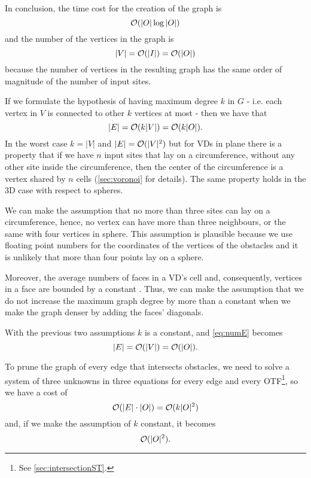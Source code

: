 \documentclass[dissertation.tex]{subfiles}
\begin{document}
In conclusion, the time cost for the creation of the graph
is
\newcommand{\eqCostGraph}{\ensuremath{\bigO(|\obsSet|\log |\obsSet|)}}
\begin{equation}
  \label{eq:costGraph}
  \eqCostGraph
\end{equation}
and the number of the vertices in the graph
is 
\begin{equation}
  \label{eq:numV}
  |V|=\mathcal{O}(|I|)=\mathcal{O}(|O|)
\end{equation}
because the number of vertices in the resulting graph has the
same order of magnitude of the number of input sites.

If we formulate the hypothesis of having maximum degree $k$ in $G$ -
i.e. each vertex in $V$ is connected to other $k$ vertices at most -
then we have that
\begin{equation}
  \label{eq:numE}
  |E|=\mathcal{O}(k|V|)=\mathcal{O}(k|O|).
\end{equation}
In the worst case $k=|V|$ and $|E|=\mathcal{O}(|V|^2)$ but for \acp{VD} in
plane there is a property that if we have $n$ input sites
that lay on a circumference, without any other site inside the
circumference, then the center of the circumference is a vertex shared
by $n$ cells (\cref{sec:voronoi} for details). The same property holds
in the 3D case with respect to spheres.

We can make the assumption
that no more than three sites can lay 
on a circumference, hence, no vertex can have more than three neighbours,
or the same with four vertices in sphere. This assumption is
plausible because we use floating point numbers for the coordinates of
the vertices of the obstacles and it is unlikely that more than
four points lay on a sphere.

Moreover, the average numbers of faces in a \ac{VD}'s cell and,
consequently, vertices
in a face are
bounded by a constant \cite{okabe}. Thus, we can make the assumption
that we do not increase
the maximum 
graph degree by more than a constant when we make the graph
denser by adding the faces' diagonals.

With the previous two assumptions $k$ is a constant,
and \cref{eq:numE} becomes
\begin{equation*}
  |E|=\mathcal{O}(|V|)=\mathcal{O}(|O|).
\end{equation*}

To prune the graph of every edge that intersects obstacles, we need
to solve a system of three unknowns in three equations for every edge
and every \ac{OTF}\footnote{See \cref{sec:intersectionST}.}, so
we have a cost of
\newcommand{\eqCostPruning}{\ensuremath{\bigO(k|\obsSet|^2)}}
\begin{equation}
  \label{eq:costPruning}
  \bigO(|E|\cdot|\obsSet|)=\eqCostPruning
\end{equation}
and, if we make the assumption of $k$ constant, it becomes
\begin{equation*}
  \mathcal{O}(|O|^2).
\end{equation*}
\end{document}

